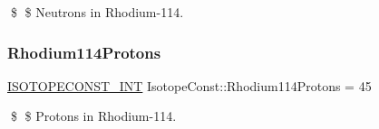 \$ \$ Neutrons in Rhodium-\/114. \mbox{\label{group___isotope_const-_rhodium-_rh114_ga53e326c8d8b9c34d8e99b5dc4df99931}} 
\subsubsection{\texorpdfstring{Rhodium114\+Protons}{Rhodium114Protons}}
{\footnotesize\ttfamily \mbox{\hyperlink{group___isotope_const-_macros_ga5f18360b3e99483a35c32d789e62621c}{I\+S\+O\+T\+O\+P\+E\+C\+O\+N\+S\+T\+\_\+\+I\+NT}} Isotope\+Const\+::\+Rhodium114\+Protons = 45}

\$ \$ Protons in Rhodium-\/114. 